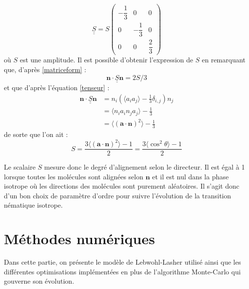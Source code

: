 \documentclass[11pt]{article}
\numberwithin{equation}{section}
\begin{document}
\begin{equation}
\underline{\underline{S}} = S
\begin{pmatrix}
 -\dfrac{1}{3} & 0  & 0\\
 0 & -\dfrac{1}{3} &0 \\
 0 &0 & \dfrac{2}{3}
 \end{pmatrix} 
 \label{matriceform}
\end{equation}
où $S$ est une amplitude. Il est possible d'obtenir l'expression de $S$ en remarquant que, d'après \ref{matriceform} :
\begin{equation*}
 \bm{n} \cdot \underline{\underline{S}} \bm{n} = 2S/3
\end{equation*} 
et que d'après l'équation \ref{tenseur} :
\begin{align*}
 \bm{n} \cdot \underline{\underline{S}} \bm{n} & = n_i\left(\langle a_i a_j \rangle-\frac{1}{3} \delta_{i,j} \right )n_j\\ 
 & = \langle n_ia_in_ja_j \rangle -\frac{1}{3}\\
 & = \langle (\bm{a}\cdot \bm{n})^2 \rangle - \frac{1}{3}
\end{align*}
de sorte que l'on ait :
\begin{equation}
S = \frac{3 \langle (\bm{a}\cdot \bm{n})^2\rangle -1}{2} = \frac{3 \langle \cos^2 \theta \rangle -1}{2}
\end{equation}

Le scalaire $S$ mesure donc le degré d'alignement selon le directeur. Il est égal à 1 lorsque toutes les molécules sont alignées selon $\bm{n}$ et il est nul dans la phase isotrope où les directions des molécules sont purement aléatoires. Il s'agit donc d'un bon choix de paramètre d'ordre pour suivre l'évolution de la transition nématique isotrope.
\newpage

\section{Méthodes numériques}
Dans cette partie, on présente le modèle de Lebwohl-Lasher utilisé ainsi que les différentes optimisations implémentées en plus de l'algorithme Monte-Carlo qui gouverne son évolution.
\end{document}
